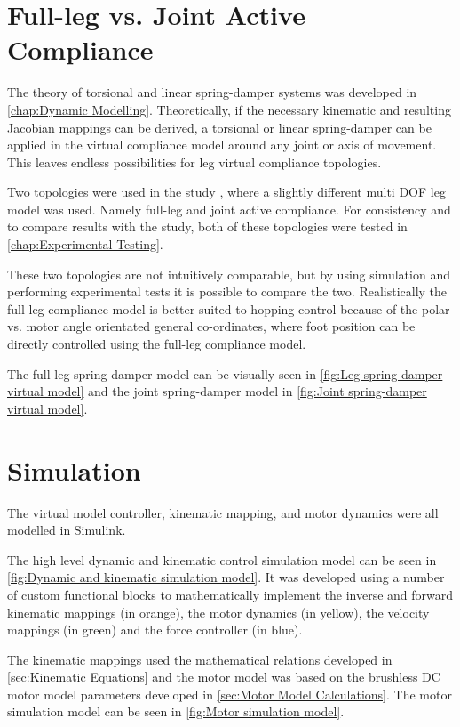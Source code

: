 \section{Full-leg vs. Joint Active Compliance}

The theory of torsional and linear spring-damper systems was developed in \cref{chap:Dynamic Modelling}. Theoretically, if the necessary kinematic and resulting Jacobian mappings can be derived, a torsional or linear spring-damper can be applied in the virtual compliance model around any joint or axis of movement. This leaves endless possibilities for leg virtual compliance topologies.

Two topologies were used in the study \cite{Kalouche2016}, where a slightly different multi DOF leg model was used. Namely full-leg and joint active compliance. For consistency and to compare results with the study, both of these topologies were tested in \cref{chap:Experimental Testing}. 

These two topologies are not intuitively comparable, but by using simulation and performing experimental tests it is possible to compare the two. Realistically the full-leg compliance model is better suited to hopping control because of the polar vs. motor angle orientated general co-ordinates, where foot position can be directly controlled using the full-leg compliance model.

The full-leg spring-damper model can be visually seen in \cref{fig:Leg spring-damper virtual model} and the joint spring-damper model in \cref{fig:Joint spring-damper virtual model}.

\section{Simulation}
\label{sec:Simulation-Control}

The virtual model controller, kinematic mapping, and motor dynamics were all modelled in Simulink. 

The high level dynamic and kinematic control simulation model can be seen in \cref{fig:Dynamic and kinematic simulation model}. It was developed using a number of custom functional blocks to mathematically implement the inverse and forward kinematic mappings (in orange), the motor dynamics (in yellow), the velocity mappings (in green) and the force controller (in blue).

The kinematic mappings used the mathematical relations developed in \cref{sec:Kinematic Equations} and the motor model was based on the brushless DC motor model parameters developed in \cref{sec:Motor Model Calculations}. The motor simulation model can be seen in \cref{fig:Motor simulation model}.

